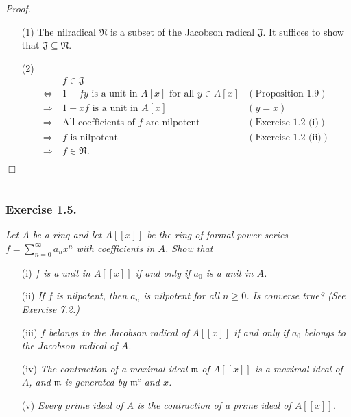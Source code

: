\documentclass{article}
\begin{document}
\emph{Proof.}
\begin{enumerate}
\item[(1)]
  The nilradical $\mathfrak{N}$ is a subset of the Jacobson radical $\mathfrak{J}$.
  It suffices to show that $\mathfrak{J} \subseteq \mathfrak{N}$.

\item[(2)]
  \begin{align*}
    & \:
    f \in \mathfrak{J} \\
    \Longleftrightarrow & \:
    \text{$1 - fy$ is a unit in $A[x]$ for all $y \in A[x]$}
      &(\text{Proposition 1.9}) \\
    \Longrightarrow & \:
    \text{$1 - xf$ is a unit in $A[x]$}
      &(y = x) \\
    \Longrightarrow & \:
    \text{All coefficients of $f$ are nilpotent}
      &(\text{Exercise 1.2 (i)}) \\
    \Longrightarrow & \:
    \text{$f$ is nilpotent}
      &(\text{Exercise 1.2 (ii)}) \\
    \Longrightarrow & \:
    f \in \mathfrak{N}.
  \end{align*}
\end{enumerate}
$\Box$ \\\\







\subsubsection*{Exercise 1.5.}
\emph{Let $A$ be a ring and let $A[[x]]$ be the ring of formal power series
$f = \sum_{n=0}^{\infty} a_n x^n$ with coefficients in $A$. Show that}
\begin{enumerate}
\item[(i)]
  \emph{$f$ is a unit in $A[[x]]$ if and only if $a_0$ is a unit in $A$.}

\item[(ii)]
  \emph{If $f$ is nilpotent, then $a_n$ is nilpotent for all $n \geq 0$.
  Is converse true? (See Exercise 7.2.)}

\item[(iii)]
  \emph{$f$ belongs to the Jacobson radical of $A[[x]]$ if and only if
  $a_0$ belongs to the Jacobson radical of $A$.}

\item[(iv)]
  \emph{The contraction of a maximal ideal $\mathfrak{m}$ of $A[[x]]$ is a maximal ideal of $A$,
  and $\mathfrak{m}$ is generated by $\mathfrak{m}^c$ and $x$.}

\item[(v)]
  \emph{Every prime ideal of $A$ is the contraction of a prime ideal of $A[[x]]$.} \\
\end{enumerate}
\end{document}
